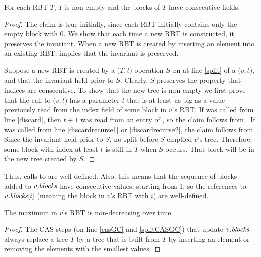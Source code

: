 \begin{invariant}
For each RBT $T$, 
$T$ is non-empty and the blocks of $T$ have consecutive  fields.
\end{invariant}
\begin{proof}
The claim is true initially, since each RBT initially contains only the empty block with  0.
We show that each time a new RBT is constructed, it preserves the invariant.
When a new RBT is created by inserting an element into an existing RBT, 
implies that the invariant is preserved.

Suppose a new RBT is created by a ($T,t$) operation $S$ on at line \ref{split} of a ($v,t$), 
and that the invariant held prior to $S$.
Clearly, $S$ preserves the property that indices are consecutive.  To show that the new tree
is non-empty we first prove that the call to ($v,t$) has a parameter $t$ that is at least as big as a value previously
read from the index field of some block in $v$'s RBT.
If  was called from line \ref{discard}, then $t+1$ was read from an entry of , so the claim follows from .
If  was called from line \ref{discardrecurse1} or \ref{discardrecurse2}, the claim follows
from .
Since the invariant held prior to $S$, no split before $S$ emptied $v$'s tree.  Therefore,
some block with index at least $t$ is still in $T$ when $S$ occurs.  That block will be in the new tree created by $S$.
\end{proof}

Thus, calls to  are well-defined.  Also, this means that the sequence of blocks added to $v.\mbox{\textit{blocks}}$ have consecutive  values, starting from 1, so the references to $v.\mbox{\textit{blocks}}[i]$ (meaning the block in $v$'s RBT with  $i$) are well-defined.

\begin{corollary}\label{maxNonDecreasing}
The maximum  in $v$'s RBT is non-decreasing over time.
\end{corollary}
\begin{proof}
The CAS steps (on line \ref{casGC} and \ref{splitCASGC}) that update $v.\mbox{\textit{blocks}}$ always replace 
a tree $T$ by a tree that is built from $T$ by inserting an element or removing the elements with 
the smallest  values.
\end{proof}

